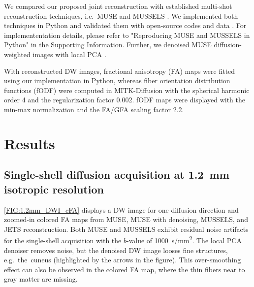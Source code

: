 \documentclass[preprint,12pt,authoryear,review]{elsarticle}
\begin{document}
	We compared our proposed joint reconstruction
	with established multi-shot reconstruction techniques,
	i.e.~MUSE \citep{chen_2013_muse} and MUSSELS \citep{mani_2017_mussels}.
	We implemented both techniques in Python and
	validated them with open-source codes and data \citep{dai_2023_julep,bilgic_2019_neatr}.
	For implemententation details, please refer to "Reproducing MUSE and MUSSELS in Python"
        in the Supporting Information.
	Further, we denoised MUSE diffusion-weighted images with local PCA
        \citep{manjon_2013_localpca,veraart_2016_denoise}.

	With reconstructed DW images, fractional anisotropy (FA) maps
	\citep{basser_1994_dmri} were fitted using our implementation in Python,
	whereas fiber orientation distribution functions (fODF)
	\citep{aganj_2009_solidangle}
	were computed in MITK-Diffusion \citep{fritzsche_2012_mitk_diff}
        with the spherical harmonic order \num{4} and the regularization factor \num{0.002}.
        fODF maps were displayed with the min-max normalization and the FA/GFA scaling factor \num{2.2}.

	\pagebreak

	\section{Results}
	\label{SEC_Resl}

	\subsection{Single-shell diffusion acquisition at \SI{1.2}{\milli\meter} isotropic resolution}

	\cref{FIG:1.2mm_DWI_cFA} displays a DW image
	for one diffusion direction and zoomed-in colored FA maps from
	MUSE, MUSE with denoising, MUSSELS, and JETS reconstruction.
	Both MUSE and MUSSELS exhibit residual noise artifacts
	for the single-shell acquisition with the $b$-value of \SI{1000}{s/mm^2}.
	The local PCA denoiser removes noise, but the denoised DW image looses fine structures,
	e.g.~the~cuneus (highlighted by the arrows in the figure).
	This over-smoothing effect can also be observed in the colored FA map,
	where the thin fibers near to gray matter are missing.
\end{document}
